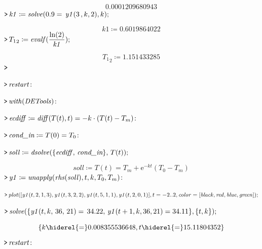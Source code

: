 \documentclass{article}
\begin{document}
\begin{dmath}\label{(4)}
 0.0001209680943
\end{dmath}
\mapleinput
{$ \displaystyle \texttt{>\,} \mathit{k1} \coloneqq \mathit{solve} ( 0.9=\,\mathit{y1} (3\,,k ,2),k); $}

\begin{dmath}\label{(5)}
\mathit{k1} \coloneqq  0.6019864022
\end{dmath}
\mapleinput
{$ \displaystyle \texttt{>\,} {T_{1}}_{2}\coloneqq \mathit{evalf} (\frac{\ln (2)}{\mathit{k1}}); $}

\begin{dmath}\label{(6)}
{T_{1}}_{2}\coloneqq  1.151433285
\end{dmath}
\mapleinput
{$ \displaystyle \texttt{>\,} \, $}

\mapleinput
{$ \displaystyle \texttt{>\,} \mathit{restart} \colon  $}

\mapleinput
{$ \displaystyle \texttt{>\,} \mathit{with} (\mathit{DETools})\colon  $}

\mapleinput
{$ \displaystyle \texttt{>\,} \mathit{ecdiff} \coloneqq \mathit{diff} (T (t),t)=-k \cdot (T (t)-T_{m})\colon  $}

\mapleinput
{$ \displaystyle \texttt{>\,} \textit{cond\_in} \coloneqq T (0)=T_{0}\colon  $}

\mapleinput
{$ \displaystyle \texttt{>\,} \mathit{soll} \coloneqq \mathit{dsolve} (\{\mathit{ecdiff} ,\,\textit{cond\_in} \},\,T (t)); $}

\begin{dmath}\label{(7)}
\mathit{soll} \coloneqq T \! \left(t \right)=T_{m}+{\mathrm e}^{-k t} \left(T_{0}-T_{m}\right)
\end{dmath}
\mapleinput
{$ \displaystyle \texttt{>\,} \mathit{y1} \coloneqq \mathit{unapply} (\mathit{rhs} (\mathit{soll}),t ,k ,T_{0},T_{m})\colon  $}

\mapleinput
{$ \displaystyle \texttt{>\,} \mathit{plot} ([\mathit{y1} (t ,2,1,3),\mathit{y1} (t ,3,2,2),\mathit{y1} (t ,5,1,1),\mathit{y1} (t ,2,0,1)],t =-2..2,\mathit{color} =[\mathit{black} ,\mathit{red} ,\mathit{blue} ,\mathit{green}]); $}

{}
\mapleinput
{$ \displaystyle \texttt{>\,} \mathit{solve} (\{\mathit{y1} (t ,k ,\,36,\,21)=\, 34.22,\,\mathit{y1} (t +1,k ,36,21)= 34.11\},\{t ,k \}); $}

\begin{dmath}\label{(8)}
\left\{k  \hiderel{=}  0.008355536648,t  \hiderel{=}  15.11804352\right\}
\end{dmath}
\mapleinput
{$ \displaystyle \texttt{>\,} \mathit{restart} \colon  $}
\end{document}
